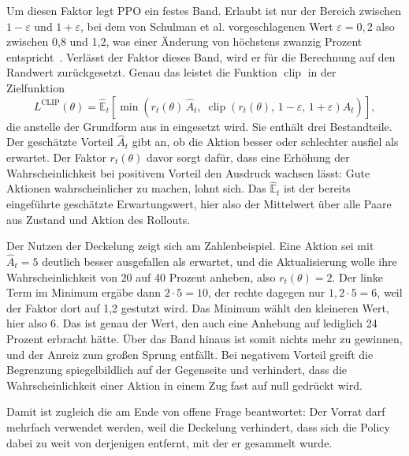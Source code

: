 Um diesen Faktor legt \ac{PPO} ein festes Band. Erlaubt ist nur der Bereich
zwischen $1-\varepsilon$ und $1+\varepsilon$, bei dem von Schulman et al.
vorgeschlagenen Wert $\varepsilon = 0{,}2$ also zwischen 0,8 und 1,2, was einer
Änderung von höchstens zwanzig Prozent
entspricht~\cite[Abschn.~3]{schulman2017ppo}. Verlässt der Faktor dieses Band,
wird er für die Berechnung auf den Randwert zurückgesetzt. Genau das leistet die
Funktion $\operatorname{clip}$ in der
Zielfunktion~\cite[Gl.~(7)]{schulman2017ppo}
%
\begin{equation}
  \label{eq:ppo-clip}
  L^{\text{CLIP}}(\theta) = \hat{\mathbb{E}}_t\!\left[
    \min\!\left(
      r_t(\theta)\,\hat{A}_t,\;
      \operatorname{clip}\!\left(r_t(\theta),\, 1-\varepsilon,\, 1+\varepsilon\right)\hat{A}_t
    \right)\right],
\end{equation}
%
die anstelle der Grundform aus  in
 eingesetzt wird. Sie enthält drei Bestandteile. Der
geschätzte Vorteil $\hat{A}_t$ gibt an, ob die Aktion besser oder schlechter
ausfiel als erwartet. Der Faktor $r_t(\theta)$ davor sorgt dafür, dass eine
Erhöhung der Wahrscheinlichkeit bei positivem Vorteil den Ausdruck wachsen
lässt: Gute Aktionen wahrscheinlicher zu machen, lohnt sich. Das
$\hat{\mathbb{E}}_t$ ist der bereits eingeführte geschätzte Erwartungswert, hier
also der Mittelwert über alle Paare aus Zustand und Aktion des Rollouts.

Der Nutzen der Deckelung zeigt sich am Zahlenbeispiel. Eine Aktion sei mit
$\hat{A}_t = 5$ deutlich besser ausgefallen als erwartet, und die Aktualisierung
wolle ihre Wahrscheinlichkeit von 20 auf 40 Prozent anheben, also
$r_t(\theta) = 2$. Der linke Term im Minimum ergäbe dann $2 \cdot 5 = 10$, der
rechte dagegen nur $1{,}2 \cdot 5 = 6$, weil der Faktor dort auf 1,2 gestutzt
wird. Das Minimum wählt den kleineren Wert, hier also 6. Das ist genau der Wert,
den auch eine Anhebung auf lediglich 24 Prozent erbracht hätte. Über das Band
hinaus ist somit nichts mehr zu gewinnen, und der Anreiz zum großen Sprung
entfällt. Bei negativem Vorteil greift die Begrenzung spiegelbildlich auf der
Gegenseite und verhindert, dass die Wahrscheinlichkeit einer Aktion in einem Zug
fast auf null gedrückt wird.

Damit ist zugleich die am Ende von  offene Frage
beantwortet: Der Vorrat darf mehrfach verwendet werden, weil die Deckelung
verhindert, dass sich die Policy dabei zu weit von derjenigen entfernt, mit der
er gesammelt wurde.

